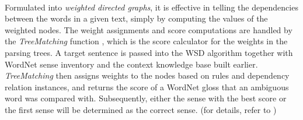 \documentclass[12 pt]{article}
\begin{document}
\paragraph{}
Formulated into \textit{weighted directed graphs}, it is effective in telling the dependencies between the words in a given text, simply by computing the values of the weighted nodes. The weight assignments and score computations are handled by the \textit{TreeMatching} function \cite{unsupervised}, which is the score calculator for the weights in the parsing trees. A target sentence is passed into the WSD algorithm together with WordNet sense inventory and the context knowledge base built earlier. \textit{TreeMatching} then assigns weights to the nodes based on rules and dependency relation instances, and returns the score of a WordNet gloss that an ambiguous word was compared with. Subsequently, either the sense with the best score or the first sense will be determined as the correct sense. (for details, refer to \cite{unsupervised})
\end{document}
